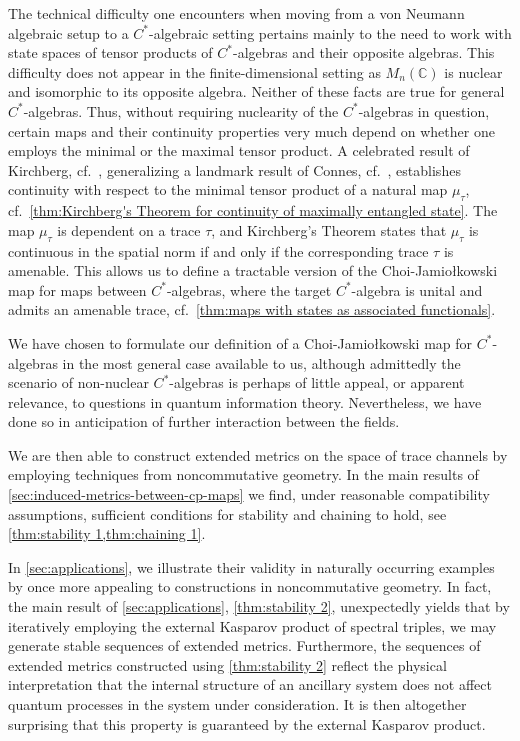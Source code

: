 \documentclass[11pt, a4paper, oneside, final, reqno]{amsart}
\newcommand{\bbC}{\mathbb{C}}
\theoremstyle{definition}
\theoremstyle{plain}
\theoremstyle{remark}
\numberwithin{equation}{section}
\begin{document}
The technical difficulty one encounters when moving from a von Neumann algebraic setup to a $C^*$-algebraic setting pertains mainly to the need to work with state spaces of tensor products of $C^*$-algebras and their opposite algebras. This difficulty does not appear in the finite-dimensional setting as $M_n(\bbC)$ is nuclear and isomorphic to its opposite algebra.  
Neither of these facts are true for general $C^*$-algebras. 
Thus, without requiring nuclearity of the $C^*$-algebras in question, certain maps and their continuity properties very much depend on whether one employs the minimal or the maximal tensor product. A celebrated result of Kirchberg, cf.~\cite{Kir93,Kir94}, generalizing a landmark result of Connes, cf.~\cite{Connes1976}, establishes continuity with respect to the minimal tensor product of a natural map $\mu_\tau$, cf.~\cref{thm:Kirchberg's Theorem for continuity of maximally entangled state}. The map $\mu_\tau$ is dependent on a trace $\tau$, and Kirchberg's Theorem states that $\mu_\tau$ is continuous in the spatial norm if and only if the corresponding trace $\tau$ is amenable. This allows us to define a tractable version of the Choi-Jamio\l{}kowski map for maps between $C^*$-algebras, where the target $C^*$-algebra is unital and admits an amenable trace, cf.~\cref{thm:maps with states as associated functionals}. 

We have chosen to formulate our definition of a Choi-Jamio\l{}kowski map for $C^*$-algebras in the most general case available to us, although admittedly the scenario of non-nuclear $C^*$-algebras is perhaps of little appeal, or apparent relevance, to questions in quantum information theory. Nevertheless, we have done so in anticipation of further interaction between the fields.

We are then able to construct extended metrics on the space of trace channels by employing techniques from noncommutative geometry. 
In the main results of \cref{sec:induced-metrics-between-cp-maps} we find, under reasonable compatibility assumptions, sufficient conditions for stability and chaining to hold, see \cref{thm:stability 1,thm:chaining 1}. 


In \cref{sec:applications}, we illustrate their validity in naturally occurring examples by once more appealing to constructions in noncommutative geometry. In fact, the main result of \cref{sec:applications}, \cref{thm:stability 2}, unexpectedly yields that by iteratively employing the external Kasparov product of spectral triples, we may generate stable sequences of extended metrics. 
Furthermore, the sequences of extended metrics constructed using \cref{thm:stability 2} reflect the physical interpretation that the internal structure of an ancillary system does not affect quantum processes in the system under consideration. It is then altogether  surprising that this property is guaranteed by the external Kasparov product.
 
\end{document}
